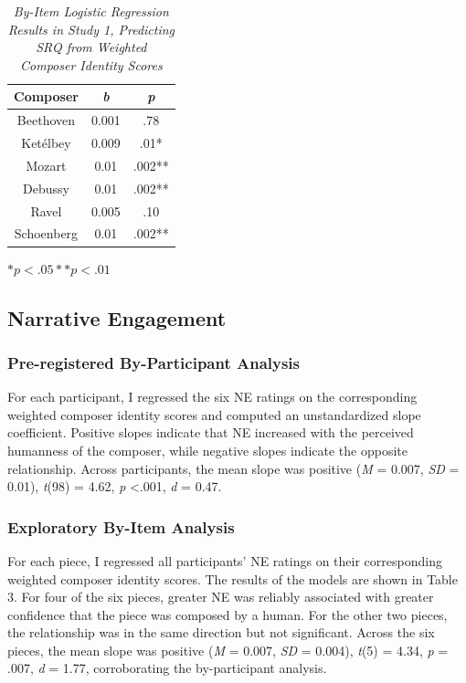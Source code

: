 \documentclass[12pt,twoside]{reedthesis}
\begin{document}
\begin{table}[h]
\centering
\caption {\emph{By-Item Logistic Regression Results in Study 1, Predicting SRQ from Weighted Composer Identity Scores}} \label{table-CI-SRQ}
\bigskip
\begin{tabular}{c c c}
\toprule
Composer & \emph{b} & \emph{p} \\
\hline
Beethoven & 0.001 & .78 \\
\hline
Ketélbey & 0.009 & .01* \\
\hline
Mozart & 0.01 & .002** \\ 
\hline
Debussy & 0.01 & .002** \\
\hline
Ravel & 0.005 & .10 \\
\hline
Schoenberg & 0.01 & .002** \\
\bottomrule
\end{tabular}\par
\bigskip
\small\textit{}$*p < .05 ** p < .01$
\end{table}




\subsection*{Narrative Engagement}
\subsubsection*{Pre-registered By-Participant Analysis}

For each participant, I regressed the six NE ratings on the corresponding weighted composer identity scores and computed an unstandardized slope coefficient. Positive slopes indicate that NE increased with the perceived humanness of the composer, while negative slopes indicate the opposite relationship. Across participants, the mean slope was positive (\emph{M} = 0.007, \emph{SD} = 0.01), \emph{t}(98) = 4.62, \emph{p} \textless .001, \emph{d} = 0.47. 

\subsubsection*{Exploratory By-Item Analysis}

For each piece, I regressed all participants’ NE ratings on their corresponding weighted composer identity scores. The results of the models are shown in Table 3. For four of the six pieces, greater NE was reliably associated with greater confidence that the piece was composed by a human. For the other two pieces, the relationship was in the same direction but not significant. Across the six pieces, the mean slope was positive (\emph{M} = 0.007, \emph{SD} = 0.004), \emph{t}(5) = 4.34, \emph{p} = .007, \emph{d} = 1.77, corroborating the by-participant analysis. 
\end{document}
